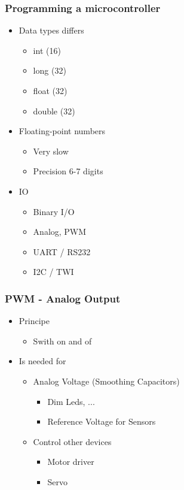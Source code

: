 \frame
{
\frametitle{Programming a microcontroller}

\begin{itemize}
\item Data types differs
	\begin{itemize}
	\item int (16)
	\item long (32)
	\item float (32)
	\item double (32)
	\end{itemize}
\item Floating-point numbers
	\begin{itemize}
	\item Very slow
	\item Precision 6-7 digits
	\end{itemize}
\item IO
	\begin{itemize}
	\item Binary I/O
	\item Analog, PWM
	\item UART / RS232
	\item I2C / TWI
	\end{itemize}
\end{itemize}
}


\frame
{
\frametitle{PWM - Analog Output}

\begin{itemize}
\item Principe
	\begin{itemize}
	\item Swith on and of
	\end{itemize}
\item Is needed for
	\begin{itemize}
	\item Analog Voltage (Smoothing Capacitors)
		\begin{itemize}
		\item Dim Leds, ... 
		\item Reference Voltage for Sensors
		\end{itemize}
	\item Control other devices
		\begin{itemize}
		\item Motor driver
		\item Servo
		\end{itemize}
	\end{itemize}
\end{itemize}
}


